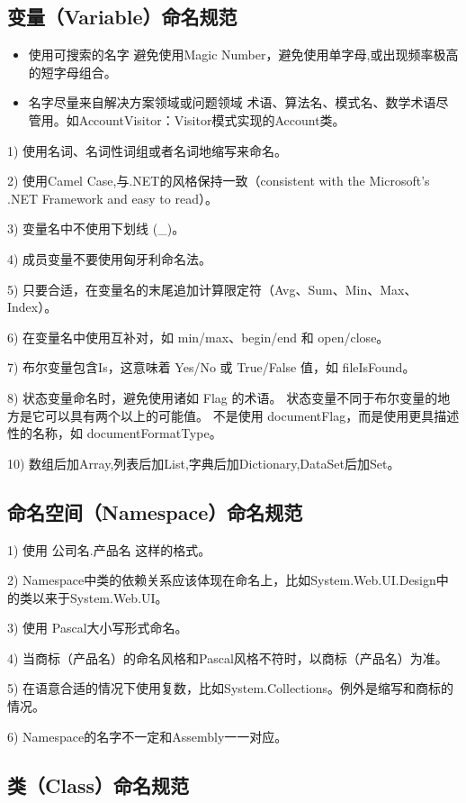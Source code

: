 \documentclass{book}
\begin{document}
\subsection{变量（Variable）命名规范}


\begin{itemize}
	\item{使用可搜索的名字} 避免使用Magic Number，避免使用单字母,或出现频率极高的短字母组合。
	\item{名字尽量来自解决方案领域或问题领域} 术语、算法名、模式名、数学术语尽管用。如AccountVisitor：Visitor模式实现的Account类。
\end{itemize}

1)  使用名词、名词性词组或者名词地缩写来命名。

2)  使用Camel Case,与.NET的风格保持一致（consistent with the Microsoft's .NET Framework and easy to read）。

3)  变量名中不使用下划线 (\_)。

4)  成员变量不要使用匈牙利命名法。

5)  只要合适，在变量名的末尾追加计算限定符（Avg、Sum、Min、Max、Index）。

6)  在变量名中使用互补对，如 min/max、begin/end 和 open/close。

7)  布尔变量包含Is，这意味着 Yes/No 或 True/False 值，如 fileIsFound。

8)  状态变量命名时，避免使用诸如 Flag 的术语。
状态变量不同于布尔变量的地方是它可以具有两个以上的可能值。
不是使用 documentFlag，而是使用更具描述性的名称，如 documentFormatType。

10) 数组后加Array,列表后加List,字典后加Dictionary,DataSet后加Set。

\subsection{命名空间（Namespace）命名规范}

1)  使用 公司名.产品名 这样的格式。

2)  Namespace中类的依赖关系应该体现在命名上，比如System.Web.UI.Design中的类以来于System.Web.UI。

3)  使用 Pascal大小写形式命名。

4)  当商标（产品名）的命名风格和Pascal风格不符时，以商标（产品名）为准。

5)  在语意合适的情况下使用复数，比如System.Collections。例外是缩写和商标的情况。

6)  Namespace的名字不一定和Assembly一一对应。

\subsection{类（Class）命名规范}
\end{document}
